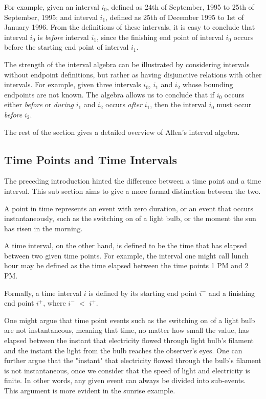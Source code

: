 \documentclass[11pt]{report}
\begin{document}
      For example, given an interval ${i_0}$, defined as 24th of September,
      1995 to 25th of September, 1995; and interval ${i_1}$, defined as 25th of
      December 1995 to 1st of January 1996. From the definitions of these
      intervals, it is easy to conclude that interval ${i_0}$ is {\em before}
      interval ${i_1}$, since the finishing end point of interval ${i_0}$
      occurs before the starting end point of interval ${i_1}$.

      The strength of the interval algebra can be illustrated by considering
      intervals without endpoint definitions, but rather as having disjunctive
      relations with other intervals. For example, given three intervals
      ${i_0}$, ${i_1}$ and ${i_2}$ whose bounding endpoints are not known. The
      algebra allows us to conclude that if ${i_0}$ occurs either {\em before}
      or {\em during} ${i_1}$ and ${i_2}$ occurs {\em after} ${i_1}$, then the
      interval ${i_0}$ must occur {\em before} ${i_2}$.

      The rest of the section gives a detailed overview of Allen's interval
      algebra.

      \subsection{Time Points and Time Intervals}

        The preceding introduction hinted the difference between a time point and a
        time interval. This sub section aims to give a more formal distinction between
        the two.

        A point in time represents an event with zero duration, or an event that occurs
        instantaneously, such as the switching on of a light bulb, or the moment the sun
        has risen in the morning.

        A time interval, on the other hand, is defined to be the time that has elapsed
        between two given time points. For example, the interval one might call lunch
        hour may be defined as the time elapsed between the time points 1 PM and 2 PM.

        Formally, a time interval $i$ is defined by its starting end point ${i^-}$ and
        a finishing end point ${i^+}$, where ${i^-}$ $<$ ${i^+}$.

        One might argue that time point events such as the switching on of a light bulb
        are not instantaneous, meaning that time, no matter how small the value, has
        elapsed between the instant that electricity flowed through light bulb's
        filament and the instant the light from the bulb reaches the observer's eyes.
        One can further argue that the "instant" that electricity flowed through the
        bulb's filament is not instantaneous, once we consider that the speed of light
        and electricity is finite. In other words, any given event can always be
        divided into sub-events. This argument is more evident in the sunrise example.
\end{document}
